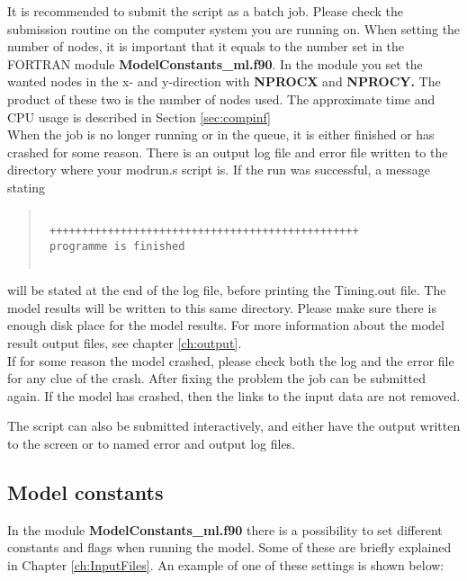 It is recommended to submit the script as a batch job. Please check the submission routine 
on the computer system you are running on. 
When setting the number of nodes, it is important that it equals to the number set in the FORTRAN module 
{\bf ModelConstants\_ml.f90}. In the module you set the wanted nodes in the x- and y-direction with {\bf NPROCX } and 
{\bf NPROCY.} The product of these two is the number of nodes used. 
The approximate time and CPU usage is described in Section \ref{sec:compinf}\\

When the job is no longer running or in the queue, it is either finished or has crashed for some reason. 
There is an output log file and error file written to the directory where your modrun.s script is. 
If the run was successful, a message stating 
\begin{quote}
\begin{verbatim}

 ++++++++++++++++++++++++++++++++++++++++++++++++
 programme is finished


\end{verbatim}
\end{quote}
will be stated at the end of the log file, before printing the Timing.out file.   
The model results will be written to this same directory. Please make 
sure there is enough disk place for the model results. 
For more information about the model result output files, see chapter \ref{ch:output}.\\

If for some reason the model crashed, please check both the log and the error file for any 
clue of the crash. After fixing the problem the job can be submitted again. If the 
model has crashed, then the links to the input data are not removed. 

The script can also be submitted interactively, and either have the output written to the screen or to 
named error and output log files. 
 

\subsection{Model constants}

In the module {\bf ModelConstants\_ml.f90 } there is a possibility to set different 
constants and flags when running the model. 
Some of these are briefly explained in Chapter \ref{ch:InputFiles}. 
An example of one of these settings is shown below:

